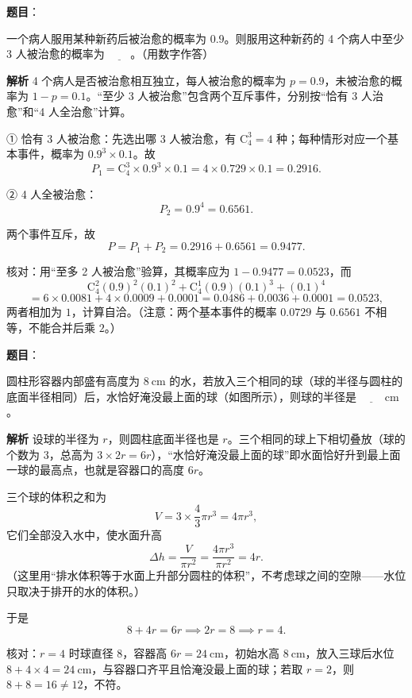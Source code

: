 \begin{answer}

\textbf{题目}：

一个病人服用某种新药后被治愈的概率为 $0.9$。则服用这种新药的 4 个病人中至少 3 人被治愈的概率为 $\underline{\qquad}$。（用数字作答）

\textbf{解析}
4 个病人是否被治愈相互独立，每人被治愈的概率为 $p=0.9$，未被治愈的概率为 $1-p=0.1$。“至少 3 人被治愈”包含两个互斥事件，分别按“恰有 3 人治愈”和“4 人全治愈”计算。

① 恰有 3 人被治愈：先选出哪 3 人被治愈，有 $\mathrm C_4^3=4$ 种；每种情形对应一个基本事件，概率为 $0.9^3\times0.1$。故
\nopagebreak[4]
\[P_1=\mathrm C_4^3\times0.9^3\times0.1=4\times0.729\times0.1=0.2916.\]

② 4 人全被治愈：
\nopagebreak[4]
\[P_2=0.9^4=0.6561.\]

两个事件互斥，故
\nopagebreak[4]
\[P=P_1+P_2=0.2916+0.6561=0.9477.\]

核对：用“至多 2 人被治愈”验算，其概率应为 $1-0.9477=0.0523$，而
\nopagebreak[4]
\[\mathrm C_4^2(0.9)^2(0.1)^2+\mathrm C_4^1(0.9)(0.1)^3+(0.1)^4\]
\nopagebreak[4]
\[=6\times0.0081+4\times0.0009+0.0001=0.0486+0.0036+0.0001=0.0523,\]
两者相加为 $1$，计算自洽。（注意：两个基本事件的概率 $0.0729$ 与 $0.6561$ 不相等，不能合并后乘 $2$。）


\end{answer}
\begin{answer}

\textbf{题目}：

圆柱形容器内部盛有高度为 $8\ \mathrm{cm}$ 的水，若放入三个相同的球（球的半径与圆柱的底面半径相同）后，水恰好淹没最上面的球（如图所示），则球的半径是 $\underline{\qquad}\ \mathrm{cm}$。
\nopagebreak[4]
\begin{center}\end{center}
\nopagebreak[4]
\textbf{解析}
设球的半径为 $r$，则圆柱底面半径也是 $r$。三个相同的球上下相切叠放（球的个数为 $3$，总高为 $3\times2r=6r$），“水恰好淹没最上面的球”即水面恰好升到最上面一球的最高点，也就是容器口的高度 $6r$。

三个球的体积之和为
\nopagebreak[4]
\[V=3\times\frac43\pi r^3=4\pi r^3,\]
它们全部没入水中，使水面升高
\nopagebreak[4]
\[\Delta h=\frac{V}{\pi r^2}=\frac{4\pi r^3}{\pi r^2}=4r.\]
（这里用“排水体积等于水面上升部分圆柱的体积”，不考虑球之间的空隙——水位只取决于排开的水的体积。）

于是
\nopagebreak[4]
\[8+4r=6r\implies 2r=8\implies r=4.\]

核对：$r=4$ 时球直径 $8$，容器高 $6r=24\ \mathrm{cm}$，初始水高 $8\ \mathrm{cm}$，放入三球后水位 $8+4\times4=24\ \mathrm{cm}$，与容器口齐平且恰淹没最上面的球；若取 $r=2$，则 $8+8=16\ne12$，不符。


\end{answer}
